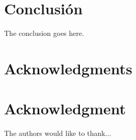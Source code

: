 \documentclass[conference,compsoc]{sty/IEEEtran}
\begin{document}

\section{Conclusión}
The conclusion goes here.







\ifCLASSOPTIONcompsoc
  \section*{Acknowledgments}
\else
  \section*{Acknowledgment}
\fi


The authors would like to thank...



\end{document}
